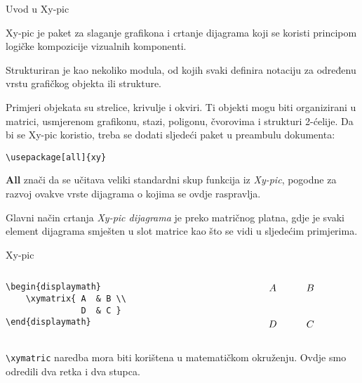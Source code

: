 \begin{frame}{Uvod u Xy-pic}

Xy-pic je paket za slaganje grafikona i crtanje dijagrama koji se koristi principom logičke kompozicije vizualnih komponenti.\newline

Strukturiran je kao nekoliko modula, od kojih svaki definira notaciju za određenu vrstu grafičkog objekta ili strukture.\newline

Primjeri objekata su strelice, krivulje i okviri. Ti objekti mogu biti organizirani u matrici, usmjerenom grafikonu, stazi, poligonu, čvorovima i strukturi 2-ćelije.\newpage
Da bi se Xy-pic koristio, treba se dodati sljedeći paket u preambulu dokumenta:

\begin{verbatim}
\usepackage[all]{xy}
\end{verbatim}
\textbf{All} znači da se učitava veliki standardni skup funkcija iz \textit{Xy-pic}, pogodne za razvoj ovakve vrste dijagrama o kojima se ovdje raspravlja. \newline

Glavni način crtanja \textit{Xy-pic dijagrama} je preko matričnog platna, gdje je svaki element dijagrama smješten u slot matrice kao što se vidi u sljedećim primjerima.
\end{frame}

\begin{frame}{Xy-pic}

\begin{columns}[c]

\begin{column}{0.5\textwidth}

\begin{verbatim}
\begin{displaymath}
    \xymatrix{ A  & B \\
               D  & C }
\end{displaymath}
\end{verbatim}

\end{column}

\begin{column}{0.5\textwidth}%

\begin{displaymath}
    \xymatrix{ A  & B \\
               D  & C  }
\end{displaymath}

\end{column}

\end{columns}
\mbox{}
\newline

\verb|\xymatric| naredba mora biti korištena u matematičkom okruženju. Ovdje smo odredili dva retka i dva stupca.\newpage
\end{frame}


